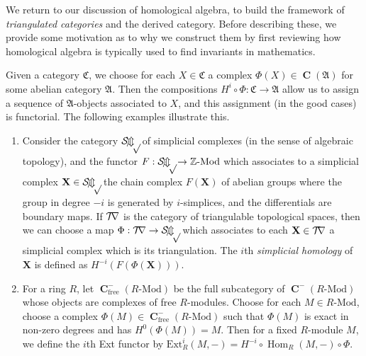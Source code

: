 \documentclass[a4paper]{article}
\theoremstyle{definition}
\theoremstyle{remark}
\newcommand{\Mod}{\ensuremath{\text{-Mod}}}
\DeclareMathOperator{\Hom}{\text{Hom}}
\DeclareMathOperator{\Ch}{\mathbf{C}}
\begin{document}
We return to our discussion of homological algebra, to build the framework of
\textit{triangulated categories} and the derived category. Before describing
these, we provide some motivation as to why we construct them by first reviewing
how homological algebra is typically used to find invariants in mathematics.

Given a category \(\mathfrak{C}\), we choose for each
\(X\in \mathfrak{C}\) a complex \(\Phi(X)\in\Ch(\mathfrak{A})\) for some abelian
category \(\mathfrak{A}\). Then the compositions \(H^i\circ \Phi:
\mathfrak{C}\rightarrow \mathfrak{A}\) allow us to assign a sequence of
\(\mathfrak{A}\)-objects associated to \(X\), and this assignment (in the good
cases) is functorial. The following examples illustrate this.
\begin{enumerate}
    \item Consider the category \(\mathcal{S\kern -2pt i \kern -2pt
        m \kern -2pt p\kern -2pt}\) of simplicial complexes (in the sense of
        algebraic topology), and the functor \(F:\mathcal{S\kern -2pt i \kern
        -2pt m \kern -2pt p\kern -2pt}\rightarrow \mathbb{Z}\Mod\) which
        associates to a simplicial complex \(\mathbf{X}\in \mathcal{S\kern -2pt
        i \kern -2pt m \kern -2pt p\kern -2pt} \) the chain complex
        \(F(\mathbf{X})\) of abelian groups where the group in degree \(-i\) is
        generated by \(i\)-simplices, and the differentials are boundary maps.
        If \(\mathcal{T\kern -3pt r}\) is the category of triangulable
        topological spaces, then we can choose a map \(\Phi: \mathcal{T\kern
        -3pt r}\rightarrow \mathcal{S\kern -2pt
        i \kern -2pt m \kern -2pt p\kern -2pt}\) which associates to each
        \(\mathbf{X}\in \mathcal{T\kern -3pt r}\) a simplicial complex which is
        its triangulation. The \(i\)th \textit{simplicial homology} of
        \(\mathbf{X}\) is defined as \(H^{-i}(F(\Phi(\mathbf{X})))\).

    \item For a ring \(R\), let \(\Ch^-_\text{free}(R\Mod)\) be the full
        subcategory of \(\Ch^-(R\Mod)\) whose objects are complexes of
        free \(R\)-modules. Choose for each \(M\in R\Mod\), choose a complex
        \({\Phi(M)\in \Ch^-_\text{free}(R\Mod)}\) such that \(\Phi(M)\) is exact
        in non-zero degrees and has \(H^0(\Phi(M))=M\).  Then for a fixed
        \(R\)-module \(M\), we define the \(i\)th Ext functor by
        \(\text{Ext}^i_R(M,-)=H^{-i}\circ \Hom_R(M,-)\circ \Phi\). 


\end{enumerate}
\end{document}
